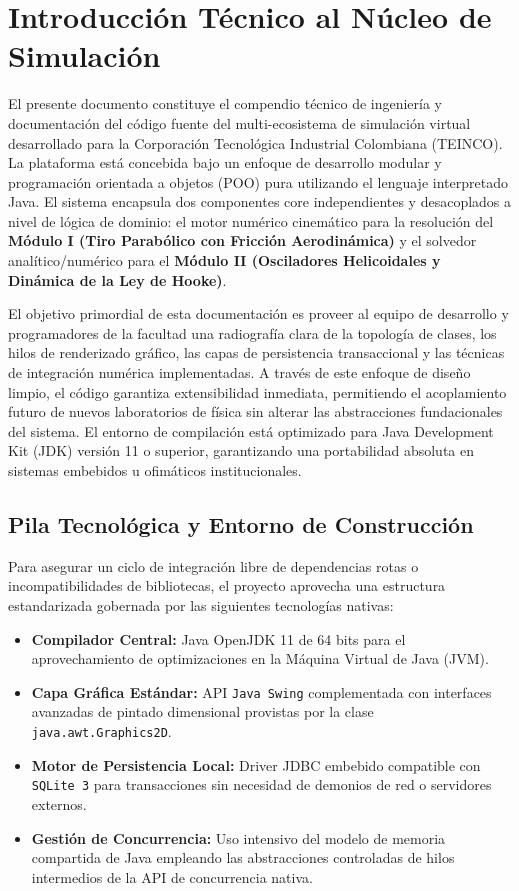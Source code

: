 \documentclass[11pt,a4paper]{article}
\begin{document}
	\section{Introducción Técnico al Núcleo de Simulación}
	El presente documento constituye el compendio técnico de ingeniería y documentación del código fuente del multi-ecosistema de simulación virtual desarrollado para la Corporación Tecnológica Industrial Colombiana (TEINCO). La plataforma está concebida bajo un enfoque de desarrollo modular y programación orientada a objetos (POO) pura utilizando el lenguaje interpretado Java. El sistema encapsula dos componentes core independientes y desacoplados a nivel de lógica de dominio: el motor numérico cinemático para la resolución del \textbf{Módulo I (Tiro Parabólico con Fricción Aerodinámica)} y el solvedor analítico/numérico para el \textbf{Módulo II (Osciladores Helicoidales y Dinámica de la Ley de Hooke)}. 
	
	El objetivo primordial de esta documentación es proveer al equipo de desarrollo y programadores de la facultad una radiografía clara de la topología de clases, los hilos de renderizado gráfico, las capas de persistencia transaccional y las técnicas de integración numérica implementadas. A través de este enfoque de diseño limpio, el código garantiza extensibilidad inmediata, permitiendo el acoplamiento futuro de nuevos laboratorios de física sin alterar las abstracciones fundacionales del sistema. El entorno de compilación está optimizado para Java Development Kit (JDK) versión 11 o superior, garantizando una portabilidad absoluta en sistemas embebidos u ofimáticos institucionales.
	
	\subsection{Pila Tecnológica y Entorno de Construcción}
	Para asegurar un ciclo de integración libre de dependencias rotas o incompatibilidades de bibliotecas, el proyecto aprovecha una estructura estandarizada gobernada por las siguientes tecnologías nativas:
	\begin{itemize}
		\item \textbf{Compilador Central:} Java OpenJDK 11 de 64 bits para el aprovechamiento de optimizaciones en la Máquina Virtual de Java (JVM).
		\item \textbf{Capa Gráfica Estándar:} API \texttt{Java Swing} complementada con interfaces avanzadas de pintado dimensional provistas por la clase \texttt{java.awt.Graphics2D}.
		\item \textbf{Motor de Persistencia Local:} Driver JDBC embebido compatible con \texttt{SQLite 3} para transacciones sin necesidad de demonios de red o servidores externos.
		\item \textbf{Gestión de Concurrencia:} Uso intensivo del modelo de memoria compartida de Java empleando las abstracciones controladas de hilos intermedios de la API de concurrencia nativa.
	\end{itemize}
	
\end{document}
